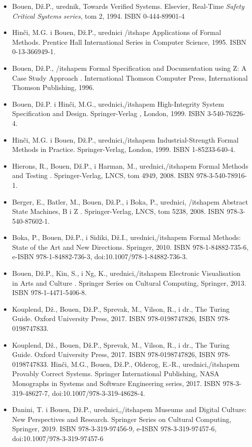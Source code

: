 \documentclass[a4paper]{article}
\begin{document}
\begin{itemize}
\item Bouen, Dž.P., urednik, Towards Verified Systems. Elsevier, Real-Time {\itshape Safety Critical Systems series}, tom 2, 1994. ISBN 0-444-89901-4
\item Hinči, M.G. i Bouen, Dž.P., urednici {/itshape Applications of Formal Methods}. Prentice Hall International Series in Computer Science, 1995. ISBN 0-13-366949-1.
\item Bouen, Dž.P., {/itshapem Formal Specification and Documentation using Z: A Case Study Approach }. International Thomson Computer Press, International Thomson Publishing, 1996. 
\item Bouen, Dž.P. i Hinči, M.G., urednici,{/itshapem High-Integrity System Specification and Design. }Springer-Verlag , London, 1999. ISBN 3-540-76226-4.
\item Hinči, M.G. i Bouen, Dž.P., urednici,{/itshapem Industrial-Strength Formal Methods in Practice. } Springer-Verlag, London, 1999. ISBN 1-85233-640-4.
\item Hierons, R., Bouen, Dž.P., i Harman, M., urednici,{/itshapem  Formal Methods and Testing} . Springer-Verlag, LNCS, tom 4949, 2008. ISBN 978-3-540-78916-1.
\item Berger, E., Batler, M., Bouen, Dž.P., i Boka, P., urednici, {/itshapem Abstract State Machines, B i Z }. Springer-Verlag, LNCS, tom 5238, 2008. ISBN 978-3-540-87602-1.
\item Boka, P., Bouen, Dž.P., i Sidiki, Dž.I., urednici,{/itshapem Formal Methods: State of the Art and New Directions}. Springer, 2010. ISBN 978-1-84882-735-6, e-ISBN 978-1-84882-736-3, doi:10.1007/978-1-84882-736-3.
\item Bouen, Dž.P., Kin, S., i Ng, K., urednici,{/itshapem Electronic Visualisation in Arts and Culture} . Springer Series on Cultural Computing, Springer, 2013. ISBN 978-1-4471-5406-8.
\item Kouplend, Dž., Bouen, Dž.P., Sprevak, M., Vilson, R., i dr., The Turing Guide. Oxford University Press, 2017. ISBN 978-0198747826, ISBN 978-0198747833.
\item Kouplend, Dž., Bouen, Dž.P., Sprevak, M., Vilson, R., i dr., The Turing Guide. Oxford University Press, 2017. ISBN 978-0198747826, ISBN 978-0198747833.
\itemem Hinči, M.G., Bouen, Dž.P., Olderog, E.-R., urednici,{/itshapem Provably Correct Systems}. Springer International Publishing, NASA Monographs in Systems and Software Engineering series, 2017. ISBN 978-3-319-48627-7, doi:10.1007/978-3-319-48628-4.
\item Đanini, T. i Bouen, Dž.P., urednici,,{/itshapem Museums and Digital Culture: New Perspectives and Research}. Springer Series on Cultural Computing, Springer, 2019. ISBN 978-3-319-97456-9, e-ISBN 978-3-319-97457-6, doi:10.1007/978-3-319-97457-6
\end{itemize}
\end{document}
